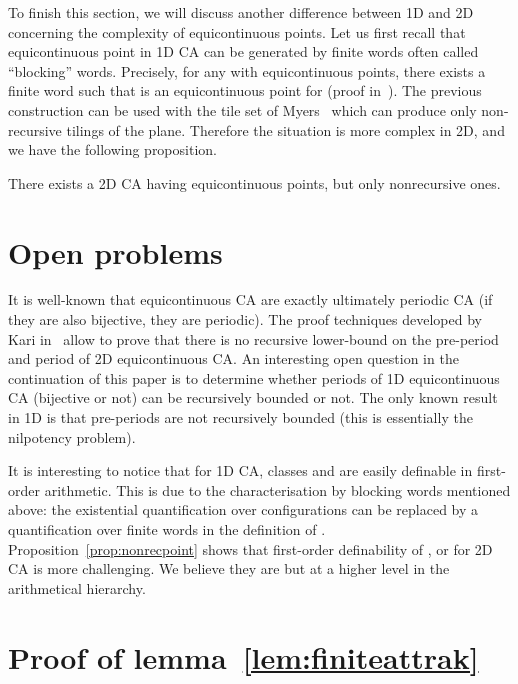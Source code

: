 \documentclass{llncs}
\begin{document}
To finish this section, we will discuss another difference between 1D
and 2D concerning the complexity of equicontinuous points. Let us
first recall that equicontinuous point in 1D CA can be generated by
finite words often called ``blocking'' words. Precisely, for any
 with equicontinuous points, there exists a finite word  such
that  is an equicontinuous point for 
(proof in~\cite{Kurka97}). The previous construction can be used with
the tile set of Myers~\cite{myers} which can produce only
non-recursive tilings of the plane. Therefore the situation is more
complex in 2D, and we have the following proposition.

\begin{proposition}
  \label{prop:nonrecpoint}
  There exists a 2D CA having equicontinuous points, but only
  nonrecursive ones.
\end{proposition}


\section{Open problems}
\label{sec:open}

It is well-known that equicontinuous CA are exactly ultimately
periodic CA (if they are also bijective, they are periodic).  The
proof techniques developed by Kari in~\cite{kari94} allow to prove
that there is no recursive lower-bound on the pre-period and period of
2D equicontinuous CA. An interesting open question in the continuation
of this paper is to determine whether periods of 1D equicontinuous CA
(bijective or not) can be recursively bounded or not. The only known
result in 1D is that pre-periods are not recursively bounded (this is
essentially the nilpotency problem).

It is interesting to notice that for 1D CA, classes  and
 are easily definable in first-order arithmetic. This is due
to the characterisation by blocking words mentioned above: the
existential quantification over configurations can be replaced by a
quantification over finite words in the definition of .
Proposition~\ref{prop:nonrecpoint} shows that first-order definability
of ,  or  for 2D CA is more challenging. We
believe they are but at a higher level in the arithmetical hierarchy.




\newpage
\appendix

\section{Proof of lemma~\ref{lem:finiteattrak}}
\end{document}
